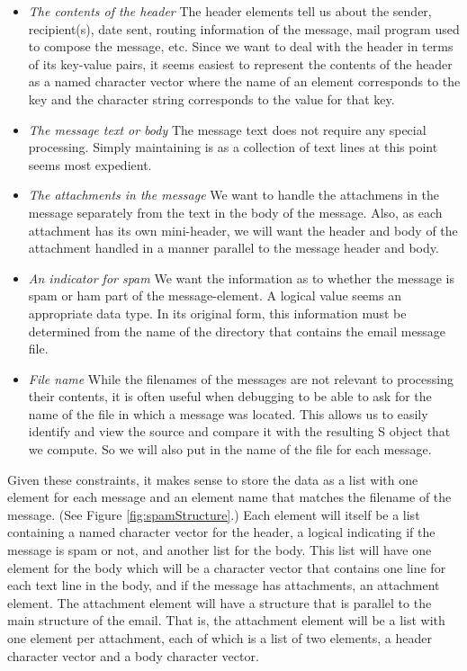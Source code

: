 \begin{itemize}
\item \textit{The contents of the header}  The header elements tell us
about the sender, recipient(s), date sent, routing information 
of the message, mail program used to compose the message, etc.
Since we want to deal with the header in terms of its key-value pairs, 
it seems easiest to represent the contents of the header as 
a named character vector where the name of an element corresponds 
to the key and the character string corresponds to the value for that key.

\item \textit{The message text or body}
The message text does not require any special processing.
Simply maintaining is as a collection of text lines at this
point seems most expedient. 

\item \textit{The attachments in the message}
We want to handle the attachmens in the message
separately from the text in the body of the message. 
Also, as each attachment has its own mini-header, we will want the header 
and body of the attachment handled in a manner parallel to the message header
and body.  

\item \textit{An indicator for spam} 
We want the information as to whether the message is spam or ham
part of the message-element. A logical value seems an appropriate 
data type.  
In its original form, 
this information must be determined from the name of the directory 
that contains the email message file.

\item \textit{File name} 
While the filenames of the messages are not relevant to processing
their contents, it is often useful when debugging to be able to ask
for the name of the file in which a message was located.  This allows
us to easily identify and view the source and compare it with the
resulting S object that we compute.
So we will also put in the name of the file for each message. 
\end{itemize}

Given these constraints, it makes sense to store the data as a list
with one element for each message and an element name that matches
the filename of the message.  (See Figure \ref{fig:spamStructure}.)
Each element will itself be a list containing a named character vector
for the header, a logical indicating if the message is spam or not,
and another list for the body.
This list will have one element for the body which will be a 
character vector that contains one line for each text line in the body,
and if the message has attachments, an attachment element.
The attachment element will have a structure that is parallel to
the main structure of the email.  That is, the attachment element will
be a list with one element per attachment, each of which is a list of 
two elements, a header character vector and a body character vector.

